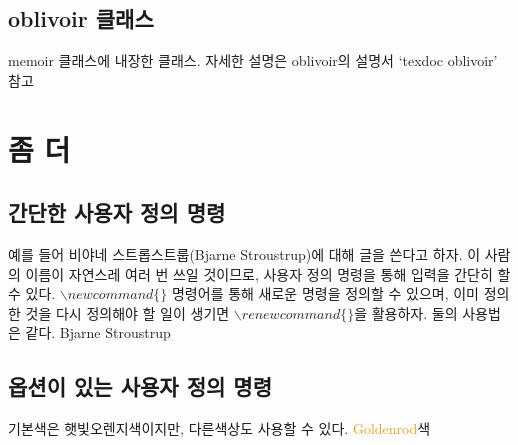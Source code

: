 \documentclass{article}
\begin{document}
\subsection{oblivoir 클래스}
memoir 클래스에  내장한 클래스. 자세한 설명은 oblivoir의 설명서 `texdoc oblivoir' 참고

\section{좀 더 }
\subsection{간단한 사용자 정의 명령}
예를 들어 비야네 스트롭스트룹(Bjarne Stroustrup)에 대해 글을 쓴다고 하자. 
이 사람의 이름이 자연스레 여러 번 쓰일 것이므로, 사용자 정의 명령을 통해 입력을 간단히 할 수 있다.
$\backslash newcommand\{\}$ 명령어를 통해 새로운 명령을 정의할 수 있으며, 
이미 정의한 것을 다시 정의해야 할 일이 생기면 $\backslash renewcommand\{\}$을 활용하자. 
둘의 사용법은 같다. 
\newcommand{\bjarne}{Bjarne Stroustrup}
\bjarne
\subsection{옵션이 있는 사용자 정의 명령}
\newcommand{\sunnytext}[2][SunOrange]{\textcolor{#1}{#2}}
기본색은 \sunnytext{햇빛오렌지색}이지만, 
다른색상도 사용할 수 있다. \sunnytext[Goldenrod]{Goldenrod}색
\printindex        %
\end{document}
